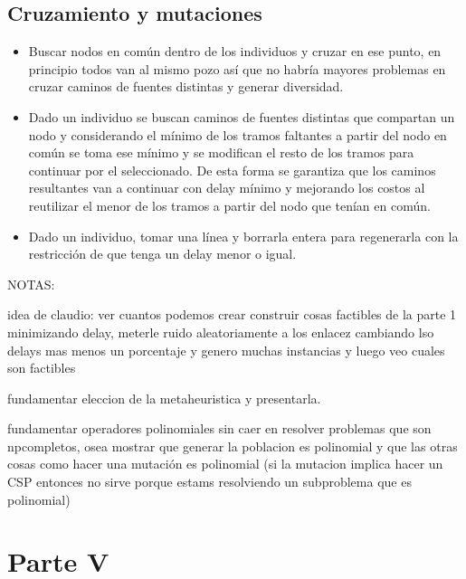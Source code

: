 \documentclass[a4paper,11pt]{article}
\theoremstyle{break}
\begin{document}
\subsection{Cruzamiento y mutaciones}
\begin{itemize}
	\item Buscar nodos en común dentro de los individuos y cruzar en ese punto, en principio todos van al mismo pozo así que no habría mayores problemas en cruzar caminos de fuentes distintas y generar diversidad.
	\item Dado un individuo se buscan caminos de fuentes distintas que compartan un nodo y considerando el mínimo de los tramos faltantes a partir del nodo en común se toma ese mínimo y se modifican el resto de los tramos para continuar por el seleccionado. De esta forma se garantiza que los caminos resultantes van a continuar con delay mínimo y mejorando los costos al reutilizar el menor de los tramos a partir del nodo que tenían en común.
	\item Dado un individuo, tomar una línea y borrarla entera para regenerarla con la restricción de que tenga un delay menor o igual.
\end{itemize}






NOTAS:

idea de claudio: ver cuantos podemos crear
construir cosas factibles de la parte 1 minimizando delay, meterle ruido aleatoriamente a los enlacez cambiando lso delays mas menos un porcentaje y genero muchas instancias y luego veo cuales son factibles

fundamentar eleccion de la metaheuristica y presentarla.
 
 
 fundamentar operadores polinomiales sin caer en resolver problemas que son npcompletos, osea mostrar que generar la poblacion es polinomial y que las otras cosas como hacer una mutación es polinomial (si la mutacion implica hacer un CSP entonces no sirve porque estams resolviendo un subproblema que es polinomial)
 
\section{Parte V}
\end{document}
